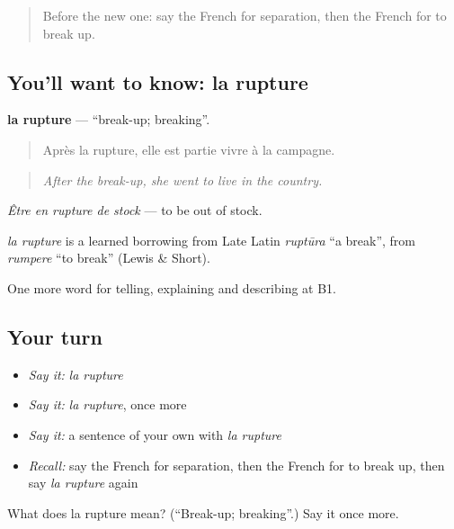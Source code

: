 \label{lesson:FR-C491-rupture}



\begin{quote}
Before the new one: say the French for separation, then the French for to break up.
\end{quote}

\subsection*{You'll want to know: la rupture}
\textbf{la rupture} — \textquotedblleft{}break-up; breaking\textquotedblright{}.

\begin{quote}
Après la rupture, elle est partie vivre à la campagne.
\end{quote}

\begin{quote}
\emph{After the break-up, she went to live in the country.}
\end{quote}

\emph{Être en rupture de stock} — to be out of stock.

\begin{cousinweb}
\emph{la rupture} is a learned borrowing from Late Latin \emph{ruptūra} \textquotedblleft{}a break\textquotedblright{}, from \emph{rumpere} \textquotedblleft{}to break\textquotedblright{} (Lewis \& Short).
\end{cousinweb}

\begin{grammarlens}[title={What you've built}]
One more word for telling, explaining and describing at B1.
\end{grammarlens}

\subsection*{Your turn}
\begin{itemize}
\raggedright
  \item \emph{Say it:} \emph{la rupture}
  \item \emph{Say it:} \emph{la rupture}, once more
  \item \emph{Say it:} a sentence of your own with \emph{la rupture}
  \item \emph{Recall:} say the French for separation, then the French for to break up, then say \emph{la rupture} again
\end{itemize}

\begin{tcolorbox}[breakable,colback=teal!4,colframe=teal!35!black,title={Before you move on}]
What does la rupture mean? (\textquotedblleft{}Break-up; breaking\textquotedblright{}.) Say it once more.
\end{tcolorbox}
